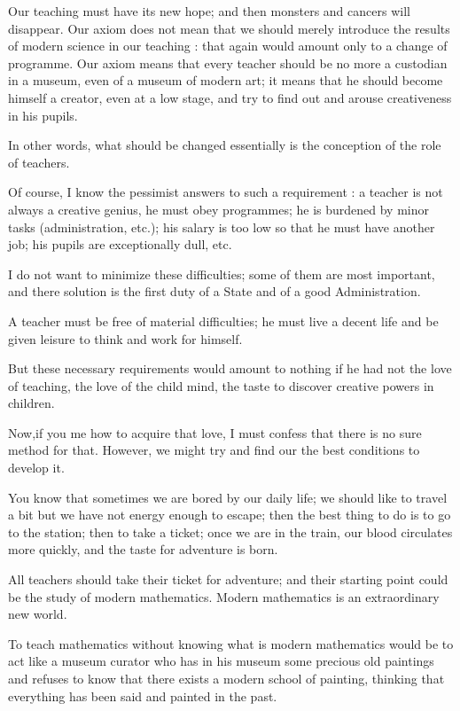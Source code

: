 Our teaching must have its new hope; and then monsters and cancers will disappear. Our axiom does not mean that we should merely introduce the results of modern science in our teaching : that again would amount only to a change of programme. Our axiom means that every teacher should be no more a custodian in a museum, even of a museum of modern art; it means that he should become himself a creator, even at a low stage, and try to find out and arouse creativeness in his pupils.

In other words, what should be changed essentially is the conception of the role of teachers.

Of course, I know the pessimist answers to such a requirement : a teacher is not always a creative genius, he must obey programmes; he is burdened by minor tasks (administration, etc.); his salary is too low so that he must have another job; his pupils are exceptionally dull, etc.

I do not want to minimize these difficulties; some of them are most important, and there solution is the first duty of a State and of a good Administration.

A teacher must be free of material difficulties; he must live a decent life and be given leisure to think and work for himself.

But these necessary requirements would amount to nothing if he had not the love of teaching, the love of the child mind, the taste to discover creative powers in children.

Now,\pageoriginale if you me how to acquire that love, I must confess that there is no sure method for that. However, we might try and find our the best conditions to develop it.

You know that sometimes we are bored by our daily life; we should like to travel a bit but we have not energy enough to escape; then the best thing to do is to go to the station; then to take a ticket; once we are in the train, our blood circulates more quickly, and the taste for adventure is born.

All teachers should take their ticket for adventure; and their starting point could be the study of modern mathematics. Modern mathematics is an extraordinary new world.

To teach mathematics without knowing what is modern mathematics would be to act like a museum curator who has in his museum some precious old paintings and refuses to know that there exists a modern school of painting, thinking that everything has been said and painted in the past.

